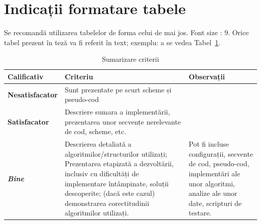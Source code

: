 \section{Indicații formatare tabele}
Se recomandă utilizarea tabelelor de forma celui de mai jos.  Font size :  9.
Orice tabel prezent în teză va fi referit în text; exemplu: a se vedea Tabel~\ref{tab:criterii}.
\begin{table}[th]\small\linespread{1}
\caption{Sumarizare criterii}
\label{tab:criterii}
\begin{tabular}{l >{\raggedright\arraybackslash}p{8cm} >{\raggedright\arraybackslash}p{4cm}}
\textbf{Calificativ} & \textbf{Criteriu} & \textbf{Observații} \\\hline
\textbf{Nesatisfacator} & Sunt prezentate pe scurt scheme și pseudo-cod & \\\hline
\textbf{Satisfacator} &Descriere sumara a implementării, prezentarea unor secvențe nerelevante de cod, scheme, etc.& \\
\hline
\textbf{\textit{Bine}} &Descrierea detaliată a algoritmilor/structurilor utilizați; Prezentarea etapizată a dezvoltării, inclusiv cu dificultăți de implementare întâmpinate, soluții descoperite; (dacă este cazul) demonstrarea corectitudinii algoritmilor utilizați. & Pot fi incluse configurații, secvente de cod, pseudo-cod, implementări ale unor algoritmi, analize ale unor date, scripturi de testare. \\
\hline
\end{tabular}
\end{table}
